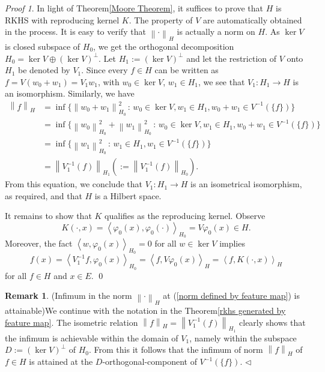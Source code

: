 \documentclass[a4paper,12pt]{article}
\theoremstyle{remark}
\newtheorem*{prf}{Proof}
\theoremstyle{definition}
\newtheorem{rem}[thm]{Remark}
\theoremstyle{definition}
\theoremstyle{definition}
\newcommand{\ip}[2]{\left<#1, #2 \right>}
\newcommand{\norm}[1]{\left\| #1 \right\|}
\newcommand{\fin}{\hfill \( \triangleleft \) }
\begin{document}
\begin{prf}
	In light of Theorem\ref{Moore Theorem}, it suffices to prove that \( H \) is RKHS with reproducing kernel \( K \). The property of \( V \) are automatically obtained in the process. It is easy to verify that \( \norm{\cdot }_H \) is actually a norm on \( H \). As \( \ker V \) is closed subspace of \( H_0 \), we get the orthogonal decomposition \( H_0 = \ker V \oplus \left( \ker V \right)^{\perp} \). Let \( H_1 := \left( \ker V \right)^{\perp} \) and let the restriction of \( V \) onto \( H_1 \) be denoted by \( V_1 \). Since every \( f \in H \) can be written as \( f = V(w_0+w_1) = V_1 w_1 \), with \( w_0 \in \ker V \), \( w_1 \in H_1 \),  we see that \( V_1 :H_1 \to H \) is an isomorphism. Similarly, we have
	\begin{equation*}
		\begin{aligned}
			\norm{f}_H
			 & = \inf \{ \norm{w_0+w_1}_{H_0} ^2 \,:\, w_0 \in \ker V, w_1 \in H_1, w_0 + w_1 \in V^{-1}(\{f\})\}                 \\
			 & = \inf \{ \norm{w_0}_{H_0}^2 + \norm{w_1}_{H_0}^2 \,:\, w_0 \in \ker V, w_1 \in H_1, w_0 + w_1 \in V^{-1}(\{f\})\} \\
			 & = \inf \{ \norm{w_1}_{H_0}^2 \,:\, w_1 \in H_1, w_1 \in V^{-1}(\{f\})\}                                            \\
			 & = \norm{V_1^{-1}(f)}_{H_1} \left( := \norm{V_1^{-1}(f)}_{H_0} \right).
		\end{aligned}
	\end{equation*}
	From this equation, we conclude that \( V_1 :H_1 \to H \) is an isometrical isomorphism, as required, and that \( H \) is a Hilbert space.

	It remains to show that \( K \) qualifies as the reproducing kernel. Observe
	\begin{equation*}
		K(\cdot ,x) = \ip{\varphi_0(x)}{\varphi_0(\cdot )}_{H_0} = V \varphi_0(x)\in H.
	\end{equation*}
	Moreover, the fact \( \ip{w}{\varphi_0(x)}_{H_0} = 0 \) for all \( w \in \ker V \) implies
	\begin{equation*}
		f(x) = \ip{V_1^{-1}f}{\varphi_0(x)}_{H_0} = \ip{f}{V \varphi_0(x)}_H = \ip{f}{K(\cdot ,x)}_H
	\end{equation*}
	for all \( f \in H \) and \( x \in E \).
	\qed\end{prf}
\begin{rem} (Infimum in the norm \( \norm{\cdot }_H \) at (\ref{norm defined by feature map}) is attainable)\label{remark attainablity of norm induced by feature map}
	We continue with the notation in the Theorem\ref{rkhs generated by feature map}. The isometric relation \( \norm{f}_H = \norm{V_1^{-1}(f)}_{H_1}\) clearly shows that the infimum is achievable within the domain of \( V_1 \), namely within the subspace \( D:=(\ker V)^{\perp } \) of \( H_0 \). From this it follows that the infimum of norm \( \norm{f}_H \) of \( f \in H \) is attained at the \( D \)-orthogonal-component of \( V^{-1}(\{f\}) \).
	\fin\end{rem}
\end{document}
